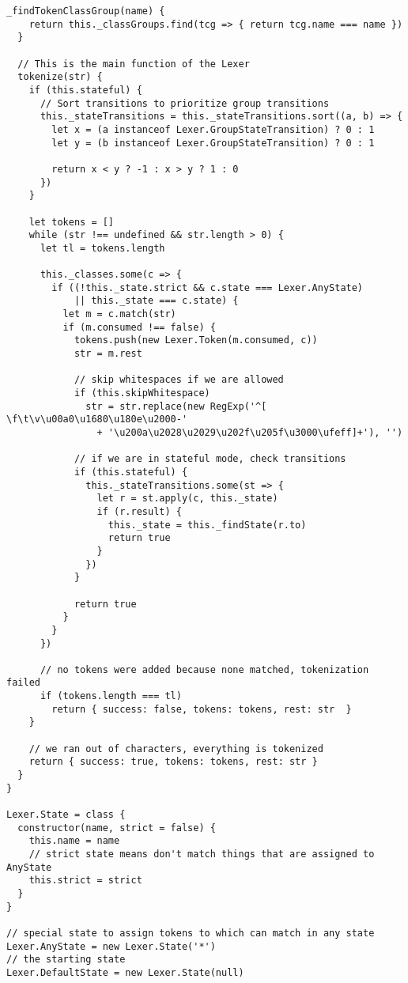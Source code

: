 \begin{lstlisting}[frame=single]
  _findTokenClassGroup(name) {
    return this._classGroups.find(tcg => { return tcg.name === name })
  }
  
  // This is the main function of the Lexer
  tokenize(str) {
    if (this.stateful) {
      // Sort transitions to prioritize group transitions
      this._stateTransitions = this._stateTransitions.sort((a, b) => {
        let x = (a instanceof Lexer.GroupStateTransition) ? 0 : 1
        let y = (b instanceof Lexer.GroupStateTransition) ? 0 : 1
        
        return x < y ? -1 : x > y ? 1 : 0
      })
    }
    
    let tokens = []
    while (str !== undefined && str.length > 0) {
      let tl = tokens.length
      
      this._classes.some(c => {
        if ((!this._state.strict && c.state === Lexer.AnyState) 
            || this._state === c.state) {
          let m = c.match(str)
          if (m.consumed !== false) {
            tokens.push(new Lexer.Token(m.consumed, c))
            str = m.rest
            
            // skip whitespaces if we are allowed
            if (this.skipWhitespace) 
              str = str.replace(new RegExp('^[ \f\t\v\u00a0\u1680\u180e\u2000-'
                + '\u200a\u2028\u2029\u202f\u205f\u3000\ufeff]+'), '')
            
            // if we are in stateful mode, check transitions
            if (this.stateful) {
              this._stateTransitions.some(st => {
                let r = st.apply(c, this._state)
                if (r.result) {
                  this._state = this._findState(r.to)
                  return true
                }
              })
            }
            
            return true
          }
        }
      })
      
      // no tokens were added because none matched, tokenization failed
      if (tokens.length === tl) 
        return { success: false, tokens: tokens, rest: str  }
    }
    
    // we ran out of characters, everything is tokenized
    return { success: true, tokens: tokens, rest: str }
  }
}

Lexer.State = class {
  constructor(name, strict = false) {
    this.name = name
    // strict state means don't match things that are assigned to AnyState
    this.strict = strict
  }
}

// special state to assign tokens to which can match in any state
Lexer.AnyState = new Lexer.State('*')
// the starting state
Lexer.DefaultState = new Lexer.State(null)


\end{lstlisting}
